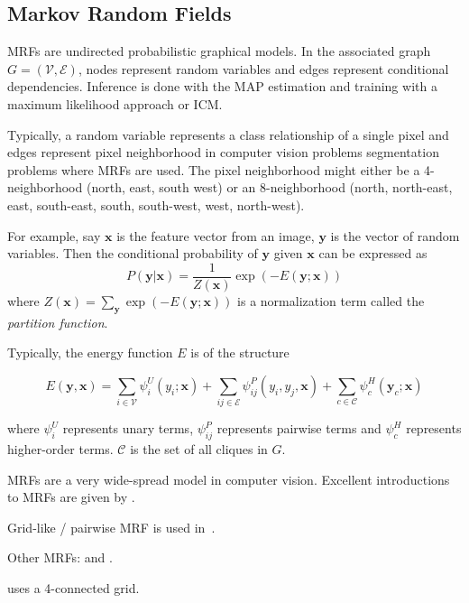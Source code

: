 
\subsection{Markov Random Fields}\label{subsec:markov-random-fields}
\Glspl{MRF} are undirected probabilistic graphical models. In the associated
graph $G=(\mathcal{V}, \mathcal{E})$, nodes represent random variables and
edges represent conditional dependencies. Inference is done with the \gls{MAP}
estimation and training with a maximum likelihood approach or \gls{ICM}.

Typically, a random variable represents a class relationship of a single pixel
and edges represent pixel neighborhood in computer vision problems segmentation problems
where \glspl{MRF} are used. The pixel neighborhood might either be a
4-neighborhood (north, east, south west) or an 8-neighborhood (north,
north-east, east, south-east, south, south-west, west, north-west).

For example, say $\mathbf{x}$ is the feature vector from an image, $\mathbf{y}$
is the vector of random variables. Then the conditional probability of $\mathbf{y}$
given $\mathbf{x}$ can be expressed as
\[P(\mathbf{y}|\mathbf{x}) = \frac{1}{Z(\mathbf{x})} \exp(-E(\mathbf{y};\mathbf{x}))\]
where $Z(\mathbf{x}) = \sum_{\mathbf{y}} \exp(-E(\mathbf{y};\mathbf{x}))$ is
a normalization term called the \textit{partition function}.

Typically, the energy function $E$ is of the structure

\[E(\mathbf{y}, \mathbf{x}) = \sum_{i \in \mathcal{V}} \psi_i^U (y_i; \mathbf{x}) + \sum_{ij \in \mathcal{E}} \psi_{ij}^P(y_i, y_j, \mathbf{x}) + \sum_{c \in \mathcal{C}} \psi_c^H(\mathbf{y}_c; \mathbf{x})\]

where $\psi_i^U$ represents unary terms, $\psi_{ij}^P$ represents pairwise
terms and $\psi_c^H$ represents higher-order terms. $\mathcal{C}$ is the set
of all cliques in $G$.


\Glspl{MRF} are a very wide-spread model in computer vision. Excellent
introductions to \glspl{MRF} are given by
\cite{blake2011markov,murphy2012machine}.


Grid-like / pairwise \gls{MRF} is used in~\cite{rother2004grabcut}.

Other \glspl{MRF}: \cite{zhang2001segmentation} and \cite{moser2012markov}.

\cite{shotton2006textonboost} uses a 4-connected grid.


